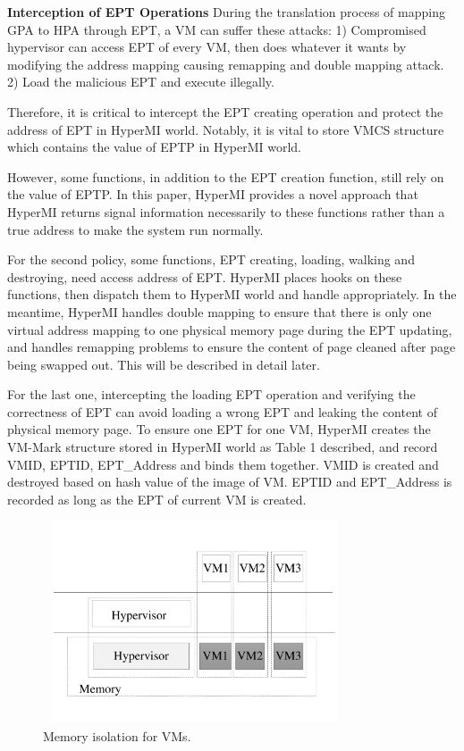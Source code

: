 \documentclass[conference]{IEEEtran}
\begin{document}
\textbf{Interception of EPT Operations }
During the translation process of mapping GPA to HPA through EPT, a VM can suffer these attacks: 1) Compromised hypervisor can access EPT of every VM, then does whatever it wants by modifying the address mapping causing remapping and double mapping attack. 2) Load the malicious EPT and execute illegally.



Therefore, it is critical to intercept the EPT creating operation and protect the address of EPT in HyperMI world. Notably, it is vital to store VMCS structure which contains the value of EPTP in HyperMI world. 


However, some functions, in addition to the EPT creation function, still rely on the value of EPTP. In this paper, HyperMI provides a novel approach that HyperMI returns signal information necessarily to these functions rather than a true address to make the system run normally. 



For the second policy, some functions, EPT creating, loading, walking and destroying, need access address of EPT. HyperMI places hooks on these functions, then dispatch them to HyperMI world and handle appropriately. In the meantime, HyperMI handles double mapping to ensure that there is only one virtual address mapping to one physical memory page during the EPT updating, and handles remapping problems to ensure the content of page cleaned after page being swapped out. This will be described in detail later.



For the last one, intercepting the loading EPT operation and verifying the correctness of EPT can avoid loading a wrong EPT and leaking the content of physical memory page. To ensure one EPT for one VM, HyperMI creates the VM-Mark structure stored in HyperMI world as Table 1 described, and record VMID, EPTID, EPT\_Address and binds them together. VMID is created and destroyed based on hash value of the image of VM. EPTID and EPT\_Address is recorded as long as the EPT of current VM is created.




\begin{figure}
\centerline{\includegraphics[width=9cm, height=6cm]{pdfvmcs3.pdf}}%
\caption{Memory isolation for VMs.} \label{fig3}
\end{figure}
\end{document}
